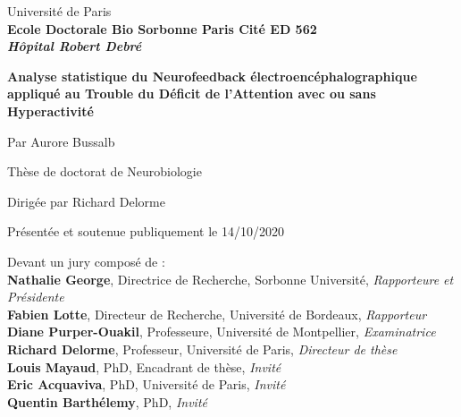 
\begin{titlepage}

\vskip 1in

\begin{center}
{\LARGE Université de Paris} \\
\vskip 0in
\textbf{Ecole Doctorale Bio Sorbonne Paris Cité ED 562} \\
\vskip 0in
\textbf{\textit{Hôpital Robert Debré}} \\
\vskip 0.3in

\Huge \textbf{Analyse statistique du Neurofeedback électroencéphalographique appliqué au Trouble du Déficit de l'Attention avec ou sans Hyperactivité}

\vskip 0.3in

{\Large Par Aurore Bussalb} \\

\vskip 0.2in

{\large Thèse de doctorat de Neurobiologie} \\

\vskip 0.15in

{\large Dirigée par Richard Delorme} \\

\vskip 0.1in

{\normalsize Présentée et soutenue publiquement le 14/10/2020} \\
\end{center}
\vskip 0.20in

\noindent Devant un jury composé de : \\%
\noindent \textbf{Nathalie George}, Directrice de Recherche, Sorbonne Université, \textit{Rapporteure et Présidente} \\
\noindent \textbf{Fabien Lotte}, Directeur de Recherche, Université de Bordeaux, \textit{Rapporteur} \\
\noindent \textbf{Diane Purper-Ouakil}, Professeure, Université de Montpellier, \textit{Examinatrice} \\
\noindent \textbf{Richard Delorme}, Professeur, Université de Paris, \textit{Directeur de thèse} \\
\noindent \textbf{Louis Mayaud}, PhD, Encadrant de thèse, \textit{Invité} \\
\noindent \textbf{Eric Acquaviva}, PhD, Université de Paris, \textit{Invité} \\
\noindent \textbf{Quentin Barthélemy}, PhD, \textit{Invité} \\


\end{titlepage}
